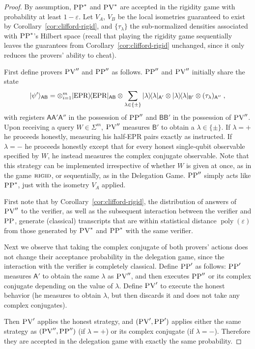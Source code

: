 \documentclass[11pt,letter]{article}
\theoremstyle{remark}
\theoremstyle{definition}
\newcommand{\ket}[1]{|#1\rangle}
\newcommand{\bra}[1]{\langle#1|}
\newcommand{\proj}[1]{\ket{#1}\!\bra{#1}}
\DeclareMathOperator{\poly}{poly}
\newcommand{\reg}[1]{{\textsf{#1}}}
\newcommand{\eps}{\varepsilon}
\newcommand{\EPR}{{\rm EPR}}
\newcommand{\rigid}{\textsc{rigid}}
\newcommand{\pv}{\textsc{PV}}
\newcommand{\pp}{\textsc{PP}}
\begin{document}
\begin{proof}
By assumption, $\pp^*$ and $\pv^*$ are accepted in the rigidity game with probability at least $1-\eps$. Let $V_A$, $V_B$ be the local isometries guaranteed to exist by Corollary~\ref{cor:clifford-rigid}, and $\{\tau_\lambda\}$ the sub-normalized densities associated with $\pp^*$'s Hilbert space (recall that playing the rigidity game sequentially leaves the guarantees from Corollary~\ref{cor:clifford-rigid} unchanged, since it only reduces the provers' ability to cheat).

First define provers $\pv''$ and $\pp''$ as follows. $\pp''$ and $\pv''$ initially share the state 
$$\ket{\psi'}_{\reg{AB}} = \otimes_{i=1}^{m} \proj{\EPR}_{\reg{AB}} \otimes \sum_{\lambda\in\{\pm\}}  \proj{\lambda}_{\reg{A}'}\otimes \proj{\lambda}_{\reg{B}'}\otimes (\tau_\lambda)_{\reg{A}''}\;,$$
with registers $\reg{A}\reg{A}'\reg{A}''$ in the possession of $\pp''$ and $\reg{BB}'$ in the possession of $\pv''$. 
Upon receiving a query $W\in \Sigma^m$, $\pv''$ measures $\reg{B}'$ to obtain a $\lambda\in\{\pm\}$. If $\lambda=+$ he proceeds honestly, measuring his half-EPR pairs exactly as instructed. If $\lambda=-$ he proceeds honestly except that for every honest single-qubit observable specified by $W$, he instead measures the complex conjugate observable. Note that this strategy can be implemented irrespective of whether $W$ is given at once, as in the game $\rigid$, or sequentially, as in the Delegation Game. $\pp''$ simply acts like $\pp^*$, just with the isometry $V_A$ applied. 

First note that by Corollary~\ref{cor:clifford-rigid}, the distribution of answers of $\pv''$ to the verifier, as well as the subsequent interaction between the verifier and $\pp$, generate (classical) transcripts that are within statistical distance $\poly(\eps)$ from those generated by $\pv^*$ and $\pp^*$ with the same verifier. 

Next we observe that taking the complex conjugate of both provers' actions does not change their acceptance probability in the delegation game, since the interaction with the verifier is completely classical. Define $\pp'$ as follows: $\pp'$ measures $\reg{A}'$ to obtain the same $\lambda$ as $\pv''$, and then executes $\pp''$ or its complex conjugate depending on the value of $\lambda$. Define $\pv'$ to execute the honest behavior (he measures to obtain $\lambda$, but then discards it and does not take any complex conjugates). 

Then $\pv'$ applies the honest strategy, and $(\pv',\pp')$ applies either the same strategy as $(\pv'',\pp'')$ (if $\lambda=+$) or its complex conjugate (if $\lambda=-$). Therefore they are accepted in the delegation game with exactly the same probability. 
\end{proof}
\end{document}
